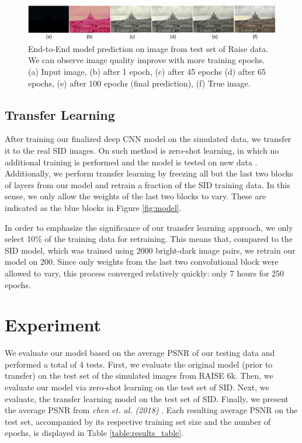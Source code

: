 \documentclass{article}
\begin{document}
\begin{center}
\begin{figure}[t!]
  \includegraphics[scale=0.42]{simmulated_pred_each_epoch}
  \caption{End-to-End model prediction on image from test set of Raise data. We can observe image quality improve with more training epochs. (a) Input image, (b) after 1 epoch, (c) after 45 epochs (d) after 65 epochs, (e) after 100 epochs (final prediction), (f) True image.}
  \label{fig:simulated_prediction}
\end{figure}
\end{center}

\subsection{Transfer Learning}
After training our finalized deep CNN model on the simulated data, we transfer it to the real SID images. On such method is zero-shot learning, in which no additional training is performed and the model is tested on new data \cite{socher2013zeroshot}. Additionally, we perform transfer learning by freezing all but the last two blocks of layers from our model and retrain a fraction of the SID training data. In this sense, we only allow the weights of the last two blocks to vary. These are indicated as the blue blocks in Figure \ref{fig:model}. 

In order to emphasize the significance of our transfer learning approach, we only select 10\% of the training data for retraining. This means that, compared to the SID model, which was trained using 2000 bright-dark image pairs, we retrain our model on 200. Since only weights from the last two convolutional block were allowed to vary, this process converged relatively quickly: only 7 hours for 250 epochs. 

 \section{Experiment}

We evaluate our model based on the average PSNR of our testing data and performed a total of 4 tests. First, we evaluate the original model (prior to transfer) on the test set of the simulated images from RAISE 6k. Then, we evaluate our model via zero-shot learning on the test set of SID. Next, we evaluate, the transfer learning model on the test set of SID. Finally, we present the average PSNR from \textit{chen et. al. (2018)} \cite{chen2018learning}. Each resulting average PSNR on the test set, accompanied by its respective training set size and the number of epochs, is displayed in Table \ref{table:results_table}.
\end{document}
